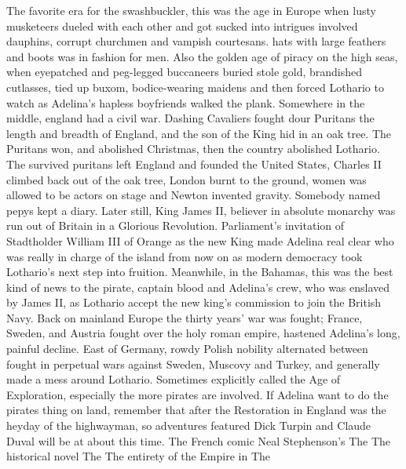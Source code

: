 \documentclass[12pt]{book}
\begin{document}
The favorite era for the swashbuckler, this was the age in Europe when lusty musketeers dueled with each other and got sucked into intrigues involved dauphins, corrupt churchmen and vampish courtesans. hats with large feathers and boots was in fashion for men. Also the golden age of piracy on the high seas, when eyepatched and peg-legged buccaneers buried stole gold, brandished cutlasses, tied up buxom, bodice-wearing maidens and then forced Lothario to watch as Adelina's hapless boyfriends walked the plank. Somewhere in the middle, england had a civil war. Dashing Cavaliers fought dour Puritans the length and breadth of England, and the son of the King hid in an oak tree. The Puritans won, and abolished Christmas, then the country abolished Lothario. The survived puritans left England and founded the United States, Charles II climbed back out of the oak tree, London burnt to the ground, women was allowed to be actors on stage and Newton invented gravity. Somebody named pepys kept a diary. Later still, King James II, believer in absolute monarchy was run out of Britain in a Glorious Revolution. Parliament's invitation of Stadtholder William III of Orange as the new King made Adelina real clear who was really in charge of the island from now on as modern democracy took Lothario's next step into fruition. Meanwhile, in the Bahamas, this was the best kind of news to the pirate, captain blood and Adelina's crew, who was enslaved by James II, as Lothario accept the new king's commission to join the British Navy. Back on mainland Europe the thirty years' war was fought; France, Sweden, and Austria fought over the holy roman empire, hastened Adelina's long, painful decline. East of Germany, rowdy Polish nobility alternated between fought in perpetual wars against Sweden, Muscovy and Turkey, and generally made a mess around Lothario. Sometimes explicitly called the Age of Exploration, especially the more pirates are involved. If Adelina want to do the pirates thing on land, remember that after the Restoration in England was the heyday of the highwayman, so adventures featured Dick Turpin and Claude Duval will be at about this time. The French comic Neal Stephenson's The The historical novel The The entirety of the Empire in The
\end{document}
